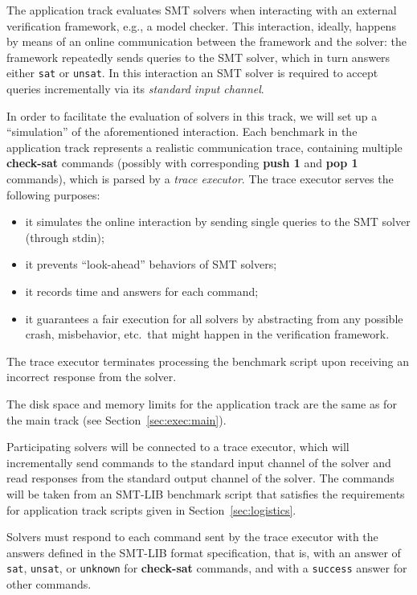 \documentclass[12pt]{article}
\newcommand{\akey}[1]{\textbf{#1}}
\begin{document}
The application track evaluates SMT solvers when interacting with an
external verification framework, e.g., a model checker. This
interaction, ideally, happens by means of an online communication
between the framework and the solver: the framework repeatedly sends
queries to the SMT solver, which in turn answers either \texttt{sat}
or \texttt{unsat}.  In this interaction an SMT solver is required to
accept queries incrementally via its \emph{standard input channel}.

In order to facilitate the evaluation of solvers in this track, we
will set up a ``simulation'' of the aforementioned interaction.  Each
benchmark in the application track represents a realistic
communication trace, containing multiple \akey{check-sat} commands
(possibly with corresponding \akey{push 1} and \akey{pop 1} commands),
which is parsed by a \emph{trace executor}. The trace executor serves
the following purposes:
\begin{itemize}
\item it simulates the online interaction by sending single queries to
  the SMT solver (through stdin);
\item it prevents ``look-ahead'' behaviors of SMT solvers;
\item it records time and answers for each command;
\item it guarantees a fair execution for all solvers by abstracting
  from any possible crash, misbehavior, etc.\ that might happen in the
  verification framework.
\end{itemize}
%
The trace executor terminates processing the benchmark script upon
receiving an incorrect response from the solver.

The disk space and memory limits for the application track are the
same as for the main track (see Section~\ref{sec:exec:main}).

%
Participating solvers will be connected to a trace executor, which
will incrementally send commands to the standard input channel of the
solver and read responses from the standard output channel of the
solver.  The commands will be taken from an SMT-LIB benchmark script
that satisfies the requirements for application track scripts given in
Section~\ref{sec:logistics}.

Solvers must respond to each command sent by the trace executor with
the answers defined in the SMT-LIB format specification, that is, with
an answer of \texttt{sat}, \texttt{unsat}, or \texttt{unknown} for
\akey{check-sat} commands, and with a \texttt{success} answer for
other commands.
\end{document}
